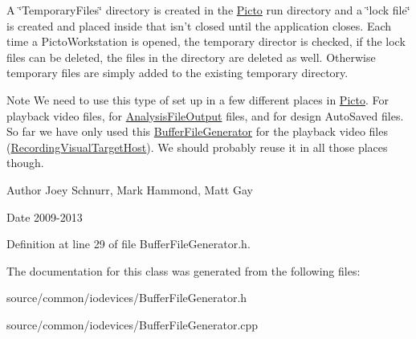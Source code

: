 A \char`\"{}\-Temporary\-Files\char`\"{} directory is created in the \hyperlink{namespace_picto}{Picto} run directory and a \char`\"{}lock file\char`\"{} is created and placed inside that isn't closed until the application closes. Each time a Picto\-Workstation is opened, the temporary director is checked, if the lock files can be deleted, the files in the directory are deleted as well. Otherwise temporary files are simply added to the existing temporary directory. \begin{DoxyNote}{Note}
We need to use this type of set up in a few different places in \hyperlink{namespace_picto}{Picto}. For playback video files, for \hyperlink{class_picto_1_1_analysis_file_output}{Analysis\-File\-Output} files, and for design Auto\-Saved files. So far we have only used this \hyperlink{class_picto_1_1_buffer_file_generator}{Buffer\-File\-Generator} for the playback video files (\hyperlink{class_picto_1_1_recording_visual_target_host}{Recording\-Visual\-Target\-Host}). We should probably reuse it in all those places though. 
\end{DoxyNote}
\begin{DoxyAuthor}{Author}
Joey Schnurr, Mark Hammond, Matt Gay 
\end{DoxyAuthor}
\begin{DoxyDate}{Date}
2009-\/2013 
\end{DoxyDate}


Definition at line 29 of file Buffer\-File\-Generator.\-h.



The documentation for this class was generated from the following files\-:\begin{DoxyCompactItemize}
\item 
source/common/iodevices/Buffer\-File\-Generator.\-h\item 
source/common/iodevices/Buffer\-File\-Generator.\-cpp\end{DoxyCompactItemize}
